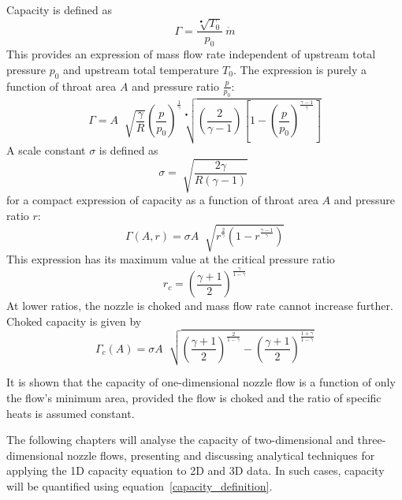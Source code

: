 \documentclass[a4paper, 11pt, twoside]{report}
\begin{document}
Capacity is defined as
\begin{equation}\label{capacity_definition}
\Gamma = \frac{\sqrt[•]{T_0}}{p_0}  \>
\dot{m}
\end{equation}
This provides an expression of mass flow rate independent of upstream total pressure $p_0$ and upstream total temperature $T_0$. The expression is purely a function of throat area $A$ and pressure ratio $\frac{p}{p_0}$:
\begin{equation}
\Gamma =
A \;
\sqrt[]{\frac{\gamma}{R}}
\left(
    \frac{p}{p_0}
\right)^\frac{1}{\gamma}
\sqrt[•]{
	\left(
		\frac{2}{\gamma - 1}  
	\right)
	\left[
		1 - \left( \frac{p}{p_0} \right)^\frac{\gamma-1}{\gamma}
	\right] 
}
\end{equation}
A scale constant $\sigma$ is defined as
\begin{equation}
\sigma = 
\sqrt[]{\frac{2\gamma}{R\left(\gamma-1\right)}} \;
\end{equation}
for a compact expression of capacity as a function of throat area $A$ and pressure ratio $r$:
\begin{equation}
\Gamma \left( A, r \right) = 
\sigma
A \;
\sqrt[]{
	r^\frac{2}{\gamma}
	\left(
		1 - r ^\frac{\gamma-1}{\gamma}
	\right) 
}
\end{equation}
This expression has its maximum value at the critical pressure ratio
\begin{equation}
r_c =
\left(
	\frac{\gamma+1}{2}
\right)
^\frac{\gamma}{1-\gamma}
\end{equation}
At lower ratios, the nozzle is choked and mass flow rate cannot increase further. Choked capacity is given by
\begin{equation}\label{choked_capacity_from_area}
\Gamma_c \left( A \right) =
\sigma
A \;
\sqrt[]{
	\left(
		\frac{\gamma + 1}{2}  
	\right)
	^\frac{2}{1-\gamma}
	-
	\left(
		\frac{\gamma + 1}{2}  
	\right)
	^\frac{1+\gamma}{1-\gamma}
}
\end{equation}

It is shown that the capacity of one-dimensional nozzle flow is a function of only the flow's minimum area, provided the flow is choked and the ratio of specific heats is assumed constant. 

The following chapters will analyse the capacity of two-dimensional and three-dimensional nozzle flows, presenting and discussing analytical techniques for applying the 1D capacity equation to 2D and 3D data. In such cases, capacity will be quantified using equation~\ref{capacity_definition}.
\end{document}
